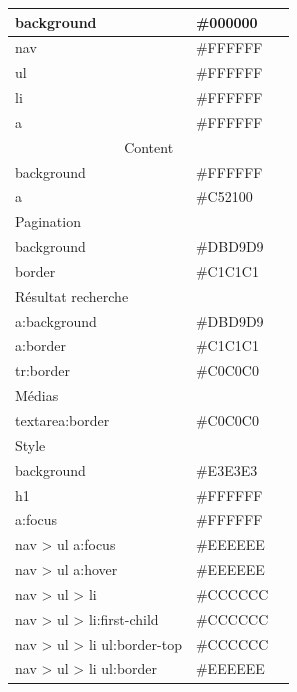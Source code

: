 \documentclass[letter, 11pt, draft]{report}
\begin{document}
\begin{table}[h]
\begin{center}
\begin{tabular}{|l|l|l|}
		background 					& \#000000 & \cellcolor[HTML]{000000} \\ \hline
		nav        					& \#FFFFFF & \cellcolor[HTML]{FFFFFF} \\ \hline
		ul         					& \#FFFFFF & \cellcolor[HTML]{FFFFFF} \\ \hline
		li         					& \#FFFFFF & \cellcolor[HTML]{FFFFFF} \\ \hline
		a          					& \#FFFFFF & \cellcolor[HTML]{FFFFFF} \\ \hline
		\multicolumn{3}{|c|}{Content} \\ \hline
		background 					& \#FFFFFF & \cellcolor[HTML]{FFFFFF} \\ \hline
		a							& \#C52100 & \cellcolor[HTML]{C52100} \\ \hline
		\multicolumn{3}{|l|}{Pagination} \\ \hline
		background 					& \#DBD9D9 & \cellcolor[HTML]{DBD9D9} \\ \hline
		border 	   					& \#C1C1C1 & \cellcolor[HTML]{C1C1C1} \\ \hline
		\multicolumn{3}{|l|}{Résultat recherche} \\ \hline
		a:background 				& \#DBD9D9 & \cellcolor[HTML]{DBD9D9} \\ \hline
		a:border   					& \#C1C1C1 & \cellcolor[HTML]{C1C1C1} \\ \hline
		tr:border  					& \#C0C0C0 & \cellcolor[HTML]{C0C0C0} \\ \hline
		\multicolumn{3}{|l|}{Médias} \\ \hline
		textarea:border 			& \#C0C0C0 & \cellcolor[HTML]{C0C0C0} \\ \hline
		\multicolumn{3}{|l|}{Style} \\ \hline
		background 					& \#E3E3E3 & \cellcolor[HTML]{E3E3E3} \\ \hline
		h1 							& \#FFFFFF & \cellcolor[HTML]{FFFFFF} \\ \hline
		a:focus 					& \#FFFFFF & \cellcolor[HTML]{FFFFFF} \\ \hline
		nav > ul a:focus 			& \#EEEEEE & \cellcolor[HTML]{EEEEEE} \\ \hline
		nav > ul a:hover 			& \#EEEEEE & \cellcolor[HTML]{EEEEEE} \\ \hline
		nav > ul > li 				& \#CCCCCC & \cellcolor[HTML]{CCCCCC} \\ \hline
		nav > ul > li:first-child 	& \#CCCCCC & \cellcolor[HTML]{CCCCCC} \\ \hline
		nav > ul > li ul:border-top & \#CCCCCC & \cellcolor[HTML]{CCCCCC} \\ \hline
		nav > ul > li ul:border 	& \#EEEEEE & \cellcolor[HTML]{EEEEEE} \\ \hline
		\end{tabular}
	\end{center}
\end{table}
\end{document}
